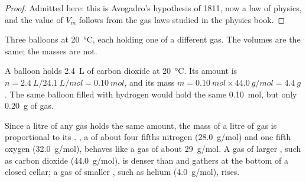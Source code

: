 \begin{proof}
Admitted here: this is Avogadro's hypothesis of 1811, now a law of
physics, and the value of $V_m$ follows from the gas laws studied in the
physics book.
\end{proof}

\begin{omfigure}

{\small Three balloons at \qty{20}{\celsius}, each holding one  of a
different gas. The volumes are the same; the masses are not.}
\end{omfigure}


\begin{example}\label{ex:g10:the-mole:balloon}
A balloon holds \qty{2.4}{L} of carbon dioxide at \qty{20}{\celsius}.
Its amount is $n = \qty{2.4}{L} / \qty{24.1}{L/mol} = \qty{0.10}{mol}$,
and its mass $m = \qty{0.10}{mol} \times \qty{44.0}{g/mol} =
\qty{4.4}{g}$. The same balloon filled with hydrogen would hold the same
\qty{0.10}{mol}, but only \qty{0.20}{g} of gas.
\end{example}

\begin{remark}\label{rem:g10:the-mole:heavy}
Since a litre of any gas holds the same amount, the mass of a litre of
gas is proportional to its . , a  of about four
fifths nitrogen (\qty{28.0}{g/mol}) and one fifth oxygen
(\qty{32.0}{g/mol}), behaves like a gas of  about
\qty{29}{g/mol}. A gas of larger , such as carbon dioxide
(\qty{44.0}{g/mol}), is denser than  and gathers at the bottom of a
closed cellar; a gas of smaller , such as helium
(\qty{4.0}{g/mol}), rises.
\end{remark}

